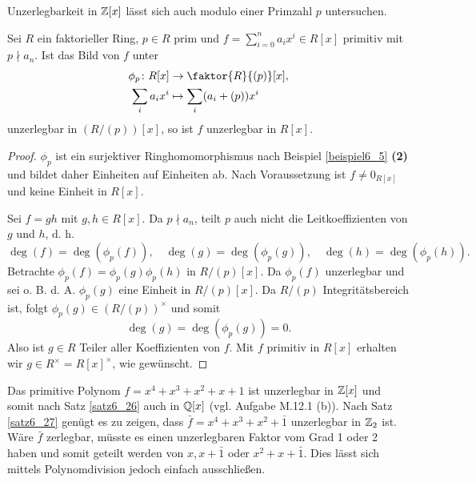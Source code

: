 Unzerlegbarkeit in $\mathbb{Z}[x]$ lässt sich auch modulo einer Primzahl $p$ untersuchen.
\begin{satz}\label{satz6_27}
	Sei $R$ ein faktorieller Ring, $p \in R$ prim und $f = \sum_{i=0}^n a_i x^i \in R[x]$ primitiv mit $p \nmid a_n$. Ist das Bild von $f$ unter
	\begin{align*}
		\phi_p \colon R[x] &\to \faktor{R}{(p)} [x],\\
		\sum_{i} a_i x^i &\mapsto \sum_i (a_i + (p)) x^i
	\end{align*}
	unzerlegbar in $(R/(p))[x]$, so ist $f$ unzerlegbar in $R[x]$.
\end{satz}
\begin{proof}
	$\phi_p$ ist ein surjektiver Ringhomomorphismus nach Beispiel \ref{beispiel6_5} \textbf{(2)} und bildet daher Einheiten auf Einheiten ab. Nach Voraussetzung ist $f \neq 0_{R[x]}$ und keine Einheit in $R[x]$. 
	
	Sei $f = gh$ mit $g,h \in R[x]$. Da $p \nmid a_n$, teilt $p$ auch nicht die Leitkoeffizienten von $g$ und $h$, d. h.
	\[\deg(f) = \deg(\phi_p(f)), \quad \deg(g) = \deg(\phi_p(g)), \quad \deg(h) = \deg(\phi_p(h)).\]
	Betrachte $\phi_p(f) = \phi_p(g) \phi_p(h)$ in $R/(p) [x]$. Da $\phi_p(f)$ unzerlegbar und sei o. B. d. A. $\phi_p(g)$ eine Einheit in $R/(p) [x]$. Da $R/(p)$ Integritätsbereich ist, folgt $\phi_p(g) \in (R/(p))^\times$ und somit 
	\[\deg(g) = \deg(\phi_p(g)) = 0.\]
	Also ist $g \in R$ Teiler aller Koeffizienten von $f$. Mit $f$ primitiv in $R[x]$ erhalten wir $g \in R^\times = R[x]^\times$, wie gewünscht.
\end{proof}
\begin{beispiel}\label{beispiel6_28}
	Das primitive Polynom $f = x^4 + x^3 + x^2 + x + 1$ ist unzerlegbar in $\mathbb{Z}[x]$ und somit nach Satz \ref{satz6_26} auch in $\mathbb{Q}[x]$ (vgl. Aufgabe M.12.1 (b)). Nach Satz \ref{satz6_27} genügt es zu zeigen, dass $\bar{f} = x^4 + x^3 + x^2 +\bar{1}$ unzerlegbar in $\mathbb{Z}_2$ ist. Wäre $\bar{f}$ zerlegbar, müsste es einen unzerlegbaren Faktor vom Grad 1 oder 2 haben und somit geteilt werden von $x, x + \bar{1}$ oder $x^2 + x + \bar{1}$. Dies lässt sich mittels Polynomdivision jedoch einfach ausschließen.
\end{beispiel}